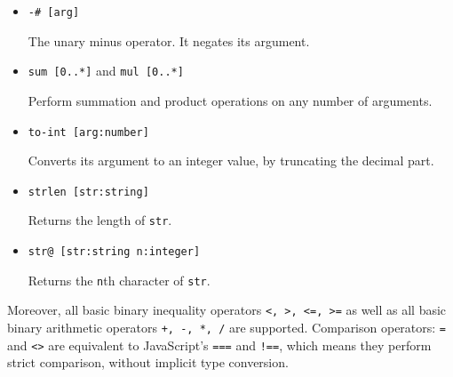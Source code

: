 \begin{itemize}
    \item \texttt{-# [arg]} 
    
    The unary minus operator. It negates its argument.
    
    \item \texttt{sum [0..*]} and \texttt{mul [0..*]}
    
    Perform summation and product operations on any number of arguments.
    \item \texttt{to-int [arg:number]} 
    
    Converts its argument to an integer value, by truncating the decimal part.
    
    \item \texttt{strlen [str:string]}
    
    Returns the length of \texttt{str}.
    \item \texttt{str@ [str:string n:integer]} 
    
    Returns the \texttt{n}th character of \texttt{str}.
\end{itemize}

Moreover, all basic binary inequality operators \texttt{<, >, <=, >=} as well as all basic binary arithmetic operators \texttt{+, -, *, /} are supported. Comparison operators: \texttt{=} and \texttt{<>} are equivalent to JavaScript's \texttt{===} and \texttt{!==}, which means they perform strict comparison, without implicit type conversion\cite[Section~Equality operators]{mdn_comparison_operators}.

